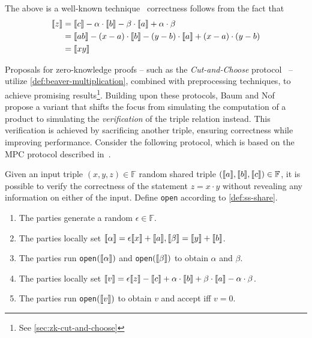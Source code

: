 \documentclass[11pt]{report}
\theoremstyle{definition}
\theoremstyle{plain}
\begin{document}
The above is a well-known technique~\cite{beaver1992efficient} correctness follows from the fact that
\begin{align*}
  \llbracket z \rrbracket & = \llbracket c \rrbracket - \alpha \cdot \llbracket b \rrbracket - \beta \cdot \llbracket a \rrbracket + \alpha \cdot \beta        \\
         & = \llbracket ab \rrbracket - (x - a) \cdot \llbracket b \rrbracket - (y - b) \cdot \llbracket a \rrbracket + (x - a) \cdot (y - b) \\
         & = \llbracket xy \rrbracket
\end{align*}

Proposals for zero-knowledge proofs -- such as the \textit{Cut-and-Choose} protocol~\cite{katz2018improved,baum2020concretely} -- utilize \autoref{def:beaver-multiplication}, combined with preprocessing techniques, to achieve promising results\footnote{See \autoref{sec:zk-cut-and-choose}}. Building upon these protocols, Baum and Nof~\cite{baum2020concretely} propose a variant that shifts the focus from simulating the computation of a product to simulating the \textit{verification} of the triple relation instead. This verification is achieved by sacrificing another triple, ensuring correctness while improving performance. Consider the following protocol, which is based on the MPC protocol described in~\cite{damgaard2012multiparty}.

\begin{protocol}\label{def:sacrifice}
  Given an input triple $(x,y,z) \in \mathbb{F}$ random shared triple $(\llbracket a \rrbracket, \llbracket b \rrbracket, \llbracket c \rrbracket) \in \mathbb{F}$, it is possible to verify the correctness of the statement $z = x \cdot y$ without revealing any information on either of the input. Define \texttt{open} according to \autoref{def:ss-share}.
  \begin{enumerate}
    \item The parties generate a random $\epsilon \in \mathbb{F}$.
    \item The parties locally set $\llbracket \alpha \rrbracket = \epsilon\llbracket x \rrbracket + \llbracket a \rrbracket, \llbracket \beta \rrbracket = \llbracket y \rrbracket + \llbracket b \rrbracket$.
    \item The parties run \texttt{open}$(\llbracket \alpha \rrbracket)$ and \texttt{open}$(\llbracket \beta \rrbracket)$ to obtain $\alpha$ and $\beta$.
    \item The parties locally set $\llbracket v \rrbracket = \epsilon\llbracket z \rrbracket - \llbracket c \rrbracket + \alpha  \cdot \llbracket b \rrbracket + \beta  \cdot \llbracket a \rrbracket - \alpha  \cdot \beta$.
    \item The parties run \texttt{open}$(\llbracket v \rrbracket)$ to obtain $v$ and accept iff $v = 0$.
  \end{enumerate}
\end{protocol}
\end{document}
